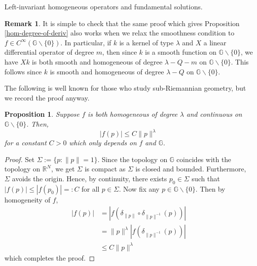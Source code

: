 \documentclass[12pt,a4paper,reqno]{amsart}
\renewcommand{\l}{\lambda}
\newcommand{\R}{\mathbb{R}}
\newcommand{\G}{\mathbb{G}}
\numberwithin{equation}{section}
\newtheorem{prop}[thm]{Proposition}
\theoremstyle{definition}
\newtheorem{rem}[thm]{Remark}
\begin{document}
\begin{subsection}{Left-invariant homogeneous operators and fundamental solutions.}
\begin{rem}\label{deriv-of-fund-soln}
It is simple to check that the same proof which gives Proposition \ref{hom-degree-of-deriv} also works when we relax the smoothness condition to $f \in C^{\infty}(\G \backslash \{0\})$. In particular, if $k$ is a kernel of type $\l$ and $X$ a linear differential operator of degree $m$, then since $k$ is a smooth function on $\G \backslash \{0\}$, we have $X k$ is both smooth and homogeneous of degree $\l - Q - m$ on $\G \backslash \{0\}$. This follows since $k$ is smooth and homogeneous of degree $\l - Q$ on $\G \backslash \{0\}$.
\end{rem}
The following is well known for those who study sub-Riemannian geometry, but we record the proof anyway. 
\begin{prop}\label{hom-func-bound}
Suppose $f$ is both homogeneous of degree $\l$ and continuous on $\G \backslash \{0\}$. Then, $$|f(p)| \leq C \| p\|^{\l}$$ for a constant $C>0$ which only depends on $f$ and $\G$. 
\end{prop}
\begin{proof}
Set $\Sigma := \{ p : \| p\| =1\}$. Since the topology on $\G$ coincides with the topology on $\R^N$, we get $\Sigma$ is compact as $\Sigma$ is closed and bounded. Furthermore, $\Sigma$ avoids the origin. Hence, by continuity, there exists $p_0 \in \Sigma$ such that $|f(p)| \leq |f(p_0)| =: C$ for all $p \in \Sigma$. Now fix any $p \in \G \backslash \{0\}$. Then by homogeneity of $f$, \begin{align*}
 |f(p)| &= |f(\delta_{\|p\|} \circ \delta_{\|p\|^{-1}}(p))| \\ &= \| p\|^{\l} |f(\delta_{\|p\|^{-1}}(p))| \\ &\leq  C \| p\|^{\l}
\end{align*}
which completes the proof.
\end{proof}



\end{subsection}
\end{document}
